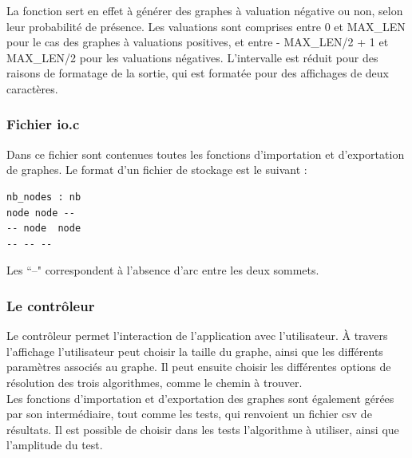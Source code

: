 \documentclass[a4paper,12pt,final] {article}
\begin{document}
La fonction sert en effet à générer des graphes à valuation négative ou non, selon leur probabilité de présence. Les valuations sont comprises entre 0 et MAX\_LEN pour le cas des graphes à valuations positives, et entre - MAX\_LEN/2 + 1 et MAX\_LEN/2 pour les valuations négatives. L'intervalle est réduit pour des raisons de formatage de la sortie, qui est formatée pour des affichages de deux caractères.\\

\subsubsection{Fichier io.c}

Dans ce fichier sont contenues toutes les fonctions d'importation et d'exportation de graphes. Le format d'un fichier de stockage est le suivant :
\begin{lstlisting}
nb_nodes : nb
node node --
-- node  node
-- -- --
\end{lstlisting}

Les ``--" correspondent à l'absence d'arc entre les deux sommets.

\subsubsection{Le contrôleur}

Le contrôleur permet l'interaction de l'application avec l'utilisateur. À travers l'affichage l'utilisateur peut choisir la taille du graphe, ainsi que les différents paramètres associés au graphe. Il peut ensuite choisir les différentes options de résolution des trois algorithmes, comme le chemin à trouver.\\

Les fonctions d'importation et d'exportation des graphes sont également gérées par son intermédiaire, tout comme les tests, qui renvoient un fichier csv de résultats. Il est possible de choisir dans les tests l'algorithme à utiliser, ainsi que l'amplitude du test. \\
\end{document}
